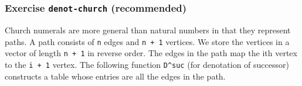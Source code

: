 \begin{fence}
\begin{code}
\AgdaSpace{}%
\AgdaSymbol{)}\AgdaSpace{}%
\AgdaSpace{}%
\AgdaSymbol{(}\AgdaSpace{}%
\AgdaSpace{}%
\AgdaSymbol{)}\<%
\\
%
\>[2]\AgdaSpace{}%
\AgdaSpace{}%
\AgdaSpace{}%
\AgdaSymbol{=}\AgdaSpace{}%
\<%
\\
%
\>[2]\AgdaSpace{}%
\AgdaSpace{}%
\AgdaSymbol{(}\AgdaSpace{}%
\AgdaSymbol{)}\AgdaSpace{}%
\AgdaSymbol{=}\AgdaSpace{}%
\<%
\end{code}
\end{fence}

\hypertarget{exercise-denot-church-recommended}{%
\subsubsection{\texorpdfstring{Exercise \texttt{denot-church}
(recommended)}{Exercise denot-church (recommended)}}\label{exercise-denot-church-recommended}}

Church numerals are more general than natural numbers in that they
represent paths. A path consists of \texttt{n} edges and
\texttt{n\ +\ 1} vertices. We store the vertices in a vector of length
\texttt{n\ +\ 1} in reverse order. The edges in the path map the ith
vertex to the \texttt{i\ +\ 1} vertex. The following function
\texttt{D\^{}suc} (for denotation of successor) constructs a table whose
entries are all the edges in the path.

